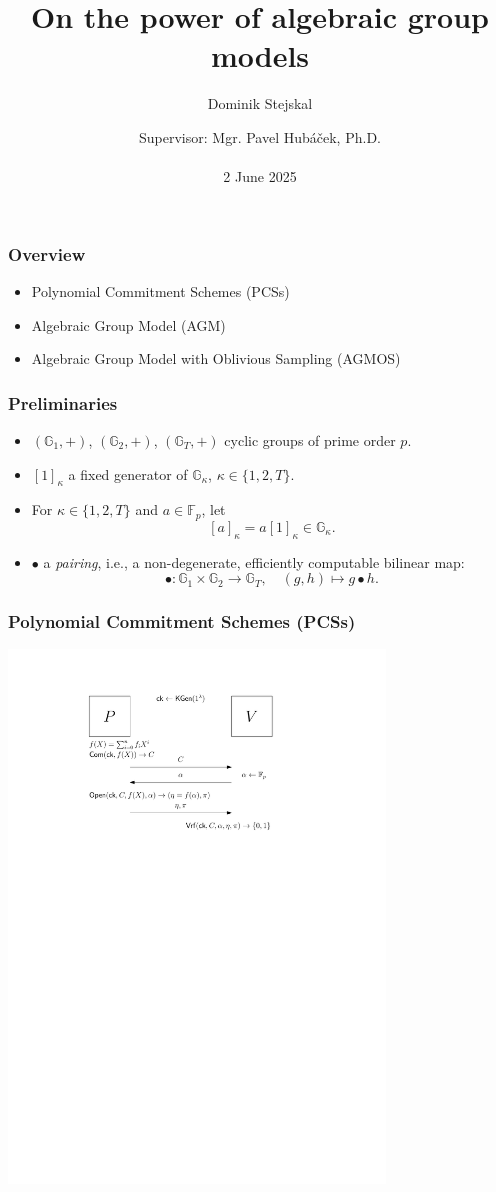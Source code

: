 \documentclass[9pt]{beamer}
\title{On the power of algebraic group models}
\author{Dominik Stejskal}
\date{Supervisor: Mgr. Pavel Hubáček, Ph.D.\\ \, \\2 June 2025}
\newcommand{\F}{\mathbb{F}}
\newcommand{\G}{\mathbb{G}}
\begin{document}
\frame{\titlepage}




\begin{frame}
\frametitle{Overview}
\begin{itemize}
    \item Polynomial Commitment Schemes (PCSs)
    \item Algebraic Group Model (AGM)
    \item Algebraic Group Model with Oblivious Sampling (AGMOS)
\end{itemize}
\end{frame}


\begin{frame}
\frametitle{Preliminaries}
\begin{itemize}
    \item $ (\G_1, +) $, $ (\G_2, +) $, $ (\G_T, +) $ cyclic groups of prime order $ p $.
    \item $ [1]_\kappa $ a fixed generator of $ \G_\kappa $, $ \kappa \in \{ 1, 2, T \} $.
    \item For $ \kappa \in \{ 1, 2, T \} $ and $ a \in \F_p $, let 
    \[
    [a]_\kappa = a[1]_\kappa \in \G_\kappa.
    \]
    \item $ \bullet $ a \textit{pairing}, i.e., a non-degenerate, efficiently computable bilinear map:
    \[
    \bullet \colon \G_1 \times \G_2 \to \G_T, \quad (g, h) \mapsto g \bullet h.
    \]
\end{itemize}
\end{frame}


\begin{frame}
\frametitle{Polynomial Commitment Schemes (PCSs)}
    \includegraphics[width=10cm]{pcs-definition.pdf}
\end{frame}
\end{document}
